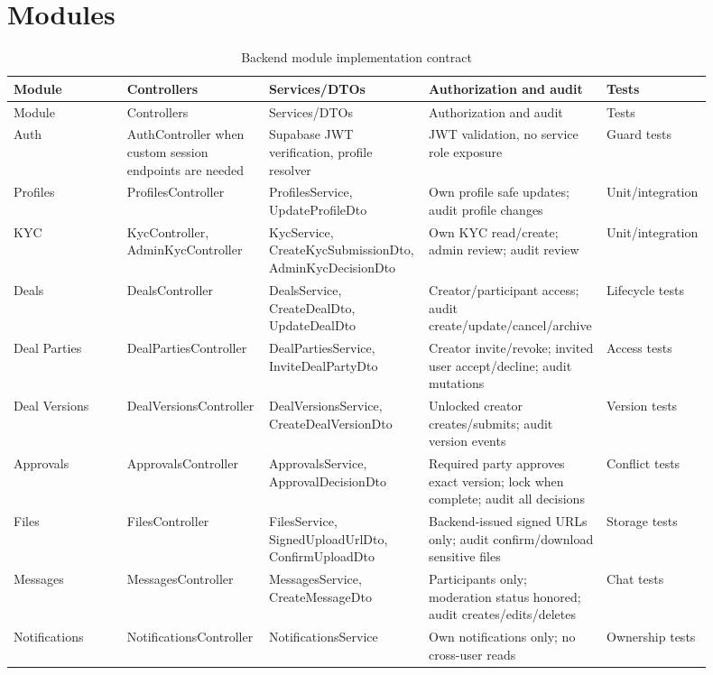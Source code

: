 \section*{Modules}
\begin{longtable}{p{0.16\linewidth}p{0.2\linewidth}p{0.2\linewidth}p{0.2\linewidth}p{0.14\linewidth}}
\caption{Backend module implementation contract}\\
\toprule
Module & Controllers & Services/DTOs & Authorization and audit & Tests \\
\midrule
\endfirsthead
\toprule
Module & Controllers & Services/DTOs & Authorization and audit & Tests \\
\midrule
\endhead
Auth & AuthController when custom session endpoints are needed & Supabase JWT verification, profile resolver & JWT validation, no service role exposure & Guard tests \\
Profiles & ProfilesController & ProfilesService, UpdateProfileDto & Own profile safe updates; audit profile changes & Unit/integration \\
KYC & KycController, AdminKycController & KycService, CreateKycSubmissionDto, AdminKycDecisionDto & Own KYC read/create; admin review; audit review & Unit/integration \\
Deals & DealsController & DealsService, CreateDealDto, UpdateDealDto & Creator/participant access; audit create/update/cancel/archive & Lifecycle tests \\
Deal Parties & DealPartiesController & DealPartiesService, InviteDealPartyDto & Creator invite/revoke; invited user accept/decline; audit mutations & Access tests \\
Deal Versions & DealVersionsController & DealVersionsService, CreateDealVersionDto & Unlocked creator creates/submits; audit version events & Version tests \\
Approvals & ApprovalsController & ApprovalsService, ApprovalDecisionDto & Required party approves exact version; lock when complete; audit all decisions & Conflict tests \\
Files & FilesController & FilesService, SignedUploadUrlDto, ConfirmUploadDto & Backend-issued signed URLs only; audit confirm/download sensitive files & Storage tests \\
Messages & MessagesController & MessagesService, CreateMessageDto & Participants only; moderation status honored; audit creates/edits/deletes & Chat tests \\
Notifications & NotificationsController & NotificationsService & Own notifications only; no cross-user reads & Ownership tests \\

\end{longtable}
